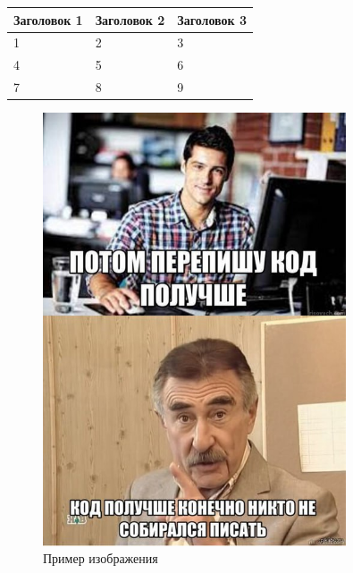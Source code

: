 \documentclass{article}
\begin{document}
\begin{tabular}{|l|l|l|}
\hline
Заголовок 1 & Заголовок 2 & Заголовок 3 \\
\hline
1 & 2 & 3 \\
\hline
4 & 5 & 6 \\
\hline
7 & 8 & 9 \\
\hline
\end{tabular}

\begin{figure}[ht]
\centering
\includegraphics[width=0.8\textwidth]{img.jpg}
\caption{Пример изображения}
\label{fig:example}
\end{figure}
\end{document}
